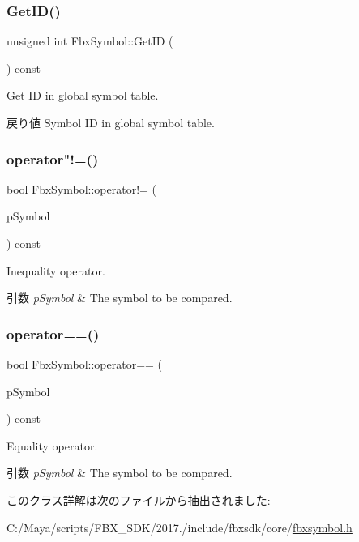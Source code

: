 \subsubsection{\texorpdfstring{Get\+I\+D()}{GetID()}}
{\footnotesize\ttfamily unsigned int Fbx\+Symbol\+::\+Get\+ID (\begin{DoxyParamCaption}{ }\end{DoxyParamCaption}) const}

Get ID in global symbol table. \begin{DoxyReturn}{戻り値}
Symbol ID in global symbol table. 
\end{DoxyReturn}
\mbox{\label{class_fbx_symbol_a8ff86aa00a433b63b02d4a5f1cd502b8}} 
\subsubsection{\texorpdfstring{operator"!=()}{operator!=()}}
{\footnotesize\ttfamily bool Fbx\+Symbol\+::operator!= (\begin{DoxyParamCaption}\item[{\hyperlink{class_fbx_symbol}{Fbx\+Symbol} const \&}]{p\+Symbol }\end{DoxyParamCaption}) const}

Inequality operator. 
\begin{DoxyParams}{引数}
{\em p\+Symbol} & The symbol to be compared. \\
\hline
\end{DoxyParams}
\mbox{\label{class_fbx_symbol_a12639dda60610e915b51c4c71e572380}} 
\subsubsection{\texorpdfstring{operator==()}{operator==()}}
{\footnotesize\ttfamily bool Fbx\+Symbol\+::operator== (\begin{DoxyParamCaption}\item[{\hyperlink{class_fbx_symbol}{Fbx\+Symbol} const \&}]{p\+Symbol }\end{DoxyParamCaption}) const}

Equality operator. 
\begin{DoxyParams}{引数}
{\em p\+Symbol} & The symbol to be compared. \\
\hline
\end{DoxyParams}


このクラス詳解は次のファイルから抽出されました\+:\begin{DoxyCompactItemize}
\item 
C\+:/\+Maya/scripts/\+F\+B\+X\+\_\+\+S\+D\+K/2017./include/fbxsdk/core/\hyperlink{fbxsymbol_8h}{fbxsymbol.\+h}\end{DoxyCompactItemize}
